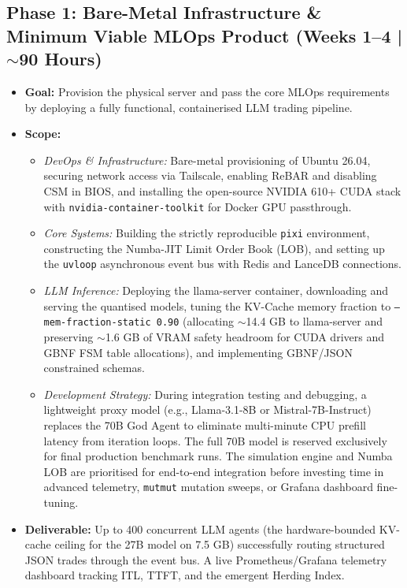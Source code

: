 \documentclass[10pt,a4paper]{article}
\begin{document}
\subsection*{Phase 1: Bare-Metal Infrastructure \& Minimum Viable MLOps Product (Weeks 1--4 | $\sim$90 Hours)}
\begin{itemize}
    \item \textbf{Goal:} Provision the physical server and pass the core MLOps requirements by deploying a fully functional, containerised LLM trading pipeline.
    \item \textbf{Scope:} 
    \begin{itemize}
        \item \textit{DevOps \& Infrastructure:} Bare-metal provisioning of Ubuntu 26.04, securing network access via Tailscale, enabling ReBAR and disabling CSM in BIOS, and installing the open-source NVIDIA 610+ CUDA stack with \texttt{nvidia-container-toolkit} for Docker GPU passthrough.
        \item \textit{Core Systems:} Building the strictly reproducible \texttt{pixi} environment, constructing the Numba-JIT Limit Order Book (LOB), and setting up the \texttt{uvloop} asynchronous event bus with Redis and LanceDB connections.
        \item \textit{LLM Inference:} Deploying the llama-server container, downloading and serving the quantised models, tuning the KV-Cache memory fraction to \texttt{--mem-fraction-static 0.90} (allocating $\sim$14.4 GB to llama-server and preserving $\sim$1.6 GB of VRAM safety headroom for CUDA drivers and GBNF FSM table allocations), and implementing GBNF/JSON constrained schemas.
        \item \textit{Development Strategy:} During integration testing and debugging, a lightweight proxy model (e.g., Llama-3.1-8B or Mistral-7B-Instruct) replaces the 70B God Agent to eliminate multi-minute CPU prefill latency from iteration loops. The full 70B model is reserved exclusively for final production benchmark runs. The simulation engine and Numba LOB are prioritised for end-to-end integration before investing time in advanced telemetry, \texttt{mutmut} mutation sweeps, or Grafana dashboard fine-tuning.
    \end{itemize}
    \item \textbf{Deliverable:} Up to 400 concurrent LLM agents (the hardware-bounded KV-cache ceiling for the 27B model on 7.5 GB) successfully routing structured JSON trades through the event bus. A live Prometheus/Grafana telemetry dashboard tracking ITL, TTFT, and the emergent Herding Index.
\end{itemize}
\end{document}
